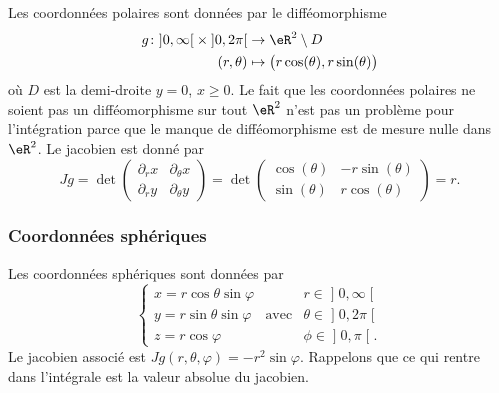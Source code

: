 Les coordonnées polaires sont données par le difféomorphisme
\begin{equation}
	\begin{aligned}
		g\colon \mathopen]0,\infty\mathclose[\times\mathopen]0,2\pi\mathclose[ &\to\eR^2\setminus D\\
		(r,\theta)&\mapsto \big( r\cos(\theta),r\sin(\theta) \big)
	\end{aligned}
\end{equation}
où $D$ est la demi-droite $y=0$, $x\geq 0$. Le fait que les coordonnées polaires ne soient pas un difféomorphisme sur tout $\eR^2$ n'est pas un problème pour l'intégration parce que le manque de difféomorphisme est de mesure nulle dans $\eR^2$. Le jacobien est donné par
\begin{equation}
	Jg=\det\begin{pmatrix}
	\partial_rx	&	\partial_{\theta}x	\\
	\partial_ry	&	\partial_{\theta}y
\end{pmatrix}=\det\begin{pmatrix}
	\cos(\theta)	&	-r\sin(\theta)	\\
	\sin(\theta)	&	r\cos(\theta)
\end{pmatrix}=r.
\end{equation}

					\subsubsection{Coordonnées sphériques}
\label{SubSubCoordSpJxhMwm}

Les coordonnées sphériques sont données par
\begin{equation}		\label{OMEqChmVarSpherique}
	\left\{
\begin{array}{lllll}
x=r\cos\theta\sin\varphi	&			&r\in\mathopen] 0 , \infty \mathclose[\\
y=r\sin\theta\sin\varphi	&	\text{avec}	&\theta\in\mathopen] 0 , 2\pi \mathclose[\\
z=r\cos\varphi			&			&\phi\in\mathopen] 0 , \pi \mathclose[.
\end{array}
\right.
\end{equation}
Le jacobien associé est $Jg(r,\theta,\varphi)=-r^2\sin\varphi$. Rappelons que ce qui rentre dans l'intégrale est la valeur absolue du jacobien.

